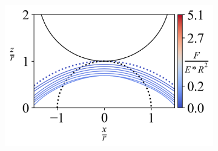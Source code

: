 \begin{figure}[H]
\begin{subfigure}{0.32\textwidth}
        \includegraphics[width=1\linewidth]{Figures/Hemisphere-LineContour-7.png}
    \end{subfigure}  


    
    \hfill
    \vspace{-0.3in}
    


\end{figure}
